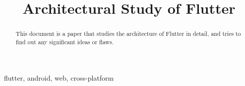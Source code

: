 \documentclass[conference, onecolumn]{IEEEtran}
\begin{document}
\title{Architectural Study of Flutter\\
}

\author{
}

\maketitle

\begin{abstract}
This document is a paper that studies the architecture of Flutter in detail, and tries to find out any significant ideas or flaws.
\end{abstract} 

\begin{IEEEkeywords}
    flutter, android, web, cross-platform
\end{IEEEkeywords}
\end{document}
